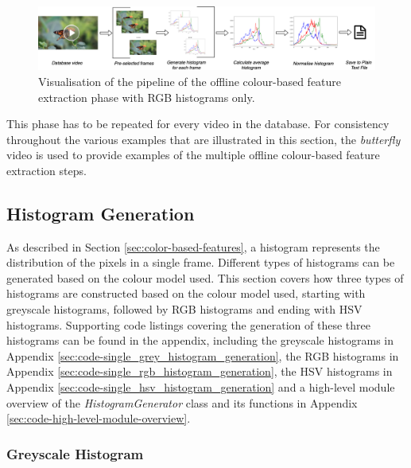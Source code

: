 \begin{figure}[h] 
\centerline{\includegraphics[width=1.2\textwidth,center]{figures/implementation/rgb_average_histogram_pipeline.png}}
\caption{\label{fig:implementation-rgb_average_histogram_pipeline}Visualisation of the pipeline of the offline colour-based feature extraction phase with RGB histograms only.}
\end{figure}

This phase has to be repeated for every video in the database. For consistency throughout the various examples that are illustrated in this section, the \textit{butterfly} video is used to provide examples of the multiple offline colour-based feature extraction steps.


\subsection{Histogram Generation}

As described in Section \ref{sec:color-based-features}, a histogram represents the distribution of the pixels in a single frame. Different types of histograms can be generated based on the colour model used. This section covers how three types of histograms are constructed based on the colour model used, starting with greyscale histograms, followed by RGB histograms and ending with HSV histograms. Supporting code listings covering the generation of these three histograms can be found in the appendix, including the greyscale histograms in Appendix \ref{sec:code-single_grey_histogram_generation}, the RGB histograms in Appendix \ref{sec:code-single_rgb_histogram_generation}, the HSV histograms in Appendix \ref{sec:code-single_hsv_histogram_generation} and a high-level module overview of the \textit{HistogramGenerator} class and its functions in Appendix \ref{sec:code-high-level-module-overview}.


\subsubsection{Greyscale Histogram}
\label{sec:implementation-greyscale-histogram}

